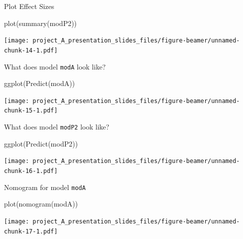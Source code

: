 \documentclass[
  ignorenonframetext,
]{beamer}
\newenvironment{Shaded}{\begin{snugshade}}{\end{snugshade}}
\newcommand{\FunctionTok}[1]{\textcolor[rgb]{0.00,0.00,0.00}{#1}}
\newcommand{\NormalTok}[1]{#1}
\begin{document}
\begin{frame}[fragile]{Plot Effect Sizes}
\protect\hypertarget{plot-effect-sizes-1}{}
\begin{Shaded}
\begin{Highlighting}[]
\FunctionTok{plot}\NormalTok{(}\FunctionTok{summary}\NormalTok{(modP2))}
\end{Highlighting}
\end{Shaded}

\texttt{[image: project\_A\_presentation\_slides\_files/figure-beamer/unnamed-chunk-14-1.pdf]}
\end{frame}

\begin{frame}[fragile]{What does model \texttt{modA} look like?}
\protect\hypertarget{what-does-model-moda-look-like}{}
\begin{Shaded}
\begin{Highlighting}[]
\FunctionTok{ggplot}\NormalTok{(}\FunctionTok{Predict}\NormalTok{(modA))}
\end{Highlighting}
\end{Shaded}

\texttt{[image: project\_A\_presentation\_slides\_files/figure-beamer/unnamed-chunk-15-1.pdf]}
\end{frame}

\begin{frame}[fragile]{What does model \texttt{modP2} look like?}
\protect\hypertarget{what-does-model-modp2-look-like}{}
\begin{Shaded}
\begin{Highlighting}[]
\FunctionTok{ggplot}\NormalTok{(}\FunctionTok{Predict}\NormalTok{(modP2))}
\end{Highlighting}
\end{Shaded}

\texttt{[image: project\_A\_presentation\_slides\_files/figure-beamer/unnamed-chunk-16-1.pdf]}
\end{frame}

\begin{frame}[fragile]{Nomogram for model \texttt{modA}}
\protect\hypertarget{nomogram-for-model-moda}{}
\begin{Shaded}
\begin{Highlighting}[]
\FunctionTok{plot}\NormalTok{(}\FunctionTok{nomogram}\NormalTok{(modA))}
\end{Highlighting}
\end{Shaded}

\texttt{[image: project\_A\_presentation\_slides\_files/figure-beamer/unnamed-chunk-17-1.pdf]}
\end{frame}
\end{document}
